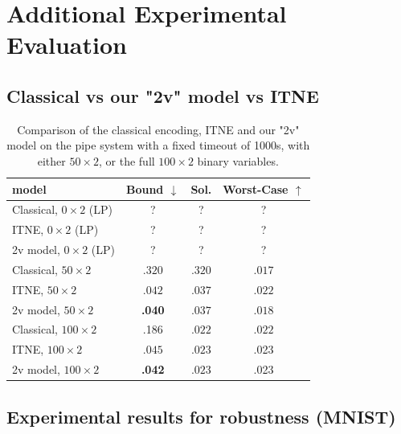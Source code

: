 	\section{Additional Experimental Evaluation}
	

\subsection{Classical vs our "2v" model vs ITNE}




\begin{table}[b!]
	\centering
	\begin{tabular}{||l|c|c|c||}\hline\hline
		model &        Bound $\downarrow$ &  Sol. &      Worst-Case $\uparrow$ \\\hline \hline
	Classical, $0 \times 2$ (LP)&  ? & ? & ?
    \\\hline
	ITNE, $0 \times 2$ (LP) &    ? & ? & ?
    \\\hline
	2v model, $0 \times 2$ (LP) &    ? & ? & ?
    \\\hline \hline
	
		Classical, $50 \times 2$ &    $.320$ &  $.320$ & $.017$ 
    \\\hline
	ITNE, $50 \times 2$ &    $.042$ &  $.037$ & $.022$
	\\ \hline
    2v model, $50 \times 2$ &    {\bf .040} &  $.037$ &  $.018$ 
    \\\hline \hline
    Classical, $100 \times 2$ &  .186  &  $.022$ & $.022$ 
    \\\hline
	ITNE, $100 \times 2$ &    $.045$ &  $.023$ & .023
    \\\hline
	2v model, $100 \times 2$&     {\bf .042} &  $.023$ &   .023 
    \\\hline \hline
	\end{tabular}
	\caption{Comparison of the classical encoding, ITNE and our "2v" model on the pipe system with a fixed timeout of 1000s, with either $50 \times 2$, 
    or the full $100 \times 2$ binary variables.}
    \label{table.classical}
\end{table}





	\subsection{Experimental results for robustness (MNIST)}
	
